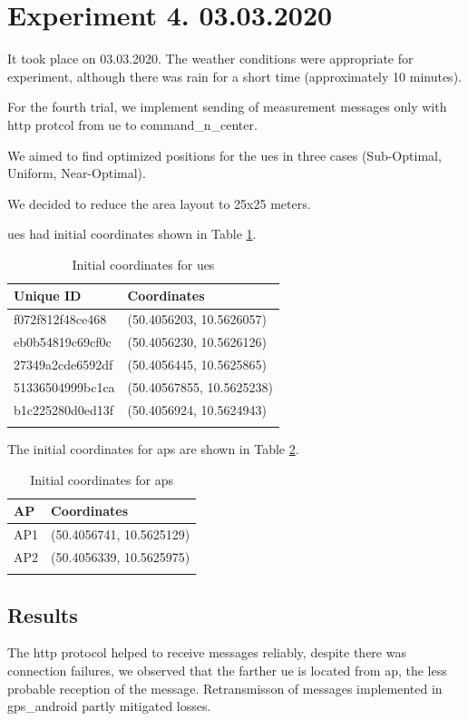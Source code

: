 \section{Experiment 4. 03.03.2020}\label{experiment-4.-03.03.2020}

It took place on 03.03.2020. The weather conditions were appropriate for experiment, although there was rain for a short time (approximately 10 minutes).

For the fourth trial, we implement sending of measurement messages only with \gls{http} protcol from \gls{ue} to \gls{command_n_center}. 

We aimed to find optimized positions for the \glspl{ue} in three cases (Sub-Optimal, Uniform, Near-Optimal).

We decided to reduce the area layout to 25x25 meters.

\glspl{ue} had initial coordinates shown in Table \ref{tab:exp4-initial-coordinates-ues}.

\begin{longtable}[]{@{}ll@{}}
	\caption{Initial coordinates for \glspl{ue}}\tabularnewline
	\toprule
	Unique ID & Coordinates\tabularnewline
	\midrule
	\endhead
	f072f812f48ce468 & (50.4056203, 10.5626057)\tabularnewline
	eb0b54819c69cf0c & (50.4056230, 10.5626126)\tabularnewline
	27349a2cde6592df & (50.4056445, 10.5625865)\tabularnewline
	51336504999bc1ca & (50.40567855, 10.5625238)\tabularnewline
	b1c225280d0ed13f & (50.4056924, 10.5624943)\tabularnewline
	\bottomrule
	\label{tab:exp4-initial-coordinates-ues}
\end{longtable}


The initial coordinates for \glspl{ap} are shown in Table \ref{tab:exp4-initial-coordinates-aps}.

\begin{longtable}[]{@{}ll@{}}
	\caption{Initial coordinates for \glspl{ap} }\tabularnewline
	\toprule
	AP & Coordinates\tabularnewline
	\midrule
	\endhead
	AP1 & (50.4056741, 10.5625129)\tabularnewline
	AP2 & (50.4056339, 10.5625975)\tabularnewline
	\bottomrule
	\label{tab:exp4-initial-coordinates-aps}
\end{longtable}

\subsection{Results}

The \gls{http} protocol helped to receive messages reliably, despite there was connection failures, we observed that the farther \gls{ue} is located from \gls{ap}, the less probable reception of the message. Retransmisson of messages implemented in \gls{gps_android} partly mitigated losses.

